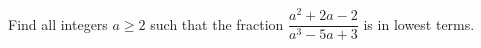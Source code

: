 Find all integers \(a\ge 2\) such that the fraction \(\dfrac{a^2+2a-2}{a^3-5a+3}\) is in lowest terms.
